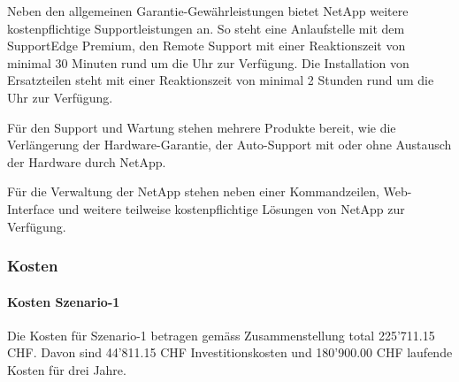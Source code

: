Neben den allgemeinen Garantie-Gewährleistungen bietet NetApp weitere kostenpflichtige Supportleistungen an. So steht eine Anlaufstelle mit dem SupportEdge Premium, den Remote Support mit einer Reaktionszeit von minimal 30 Minuten rund um die Uhr zur Verfügung. Die Installation von Ersatzteilen steht mit einer Reaktionszeit von minimal 2 Stunden rund um die Uhr zur Verfügung. 

Für den Support und Wartung stehen mehrere Produkte bereit, wie die Verlängerung der Hardware-Garantie, der Auto-Support mit oder ohne Austausch der Hardware durch NetApp.

Für die Verwaltung der NetApp stehen neben einer Kommandzeilen, Web-Interface und weitere teilweise kostenpflichtige Lösungen von NetApp zur Verfügung. 

\subsubsection*{Kosten}

\paragraph*{Kosten Szenario-1}
Die Kosten für Szenario-1 betragen gemäss Zusammenstellung total 225'711.15 CHF. Davon sind 44'811.15 CHF Investitionskosten und 180'900.00 CHF laufende Kosten für drei Jahre.

